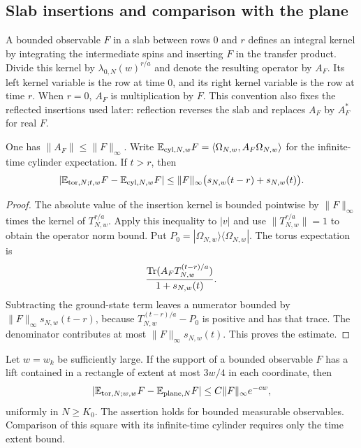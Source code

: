 \subsection{Slab insertions and comparison with the plane}

A bounded observable $F$ in a slab between rows $0$ and $r$ defines
an integral kernel by integrating the intermediate spins and inserting
$F$ in the transfer product.  Divide this kernel by
$\lambda_{0,N}(w)^{r/a}$ and denote the resulting operator by $A_F$.
Its left kernel variable is the row at time $0$, and its right kernel
variable is the row at time $r$.  When $r=0$, $A_F$ is multiplication
by $F$.  This convention also fixes the reflected insertions used
later: reflection reverses the slab and replaces $A_F$ by $A_F^*$
for real $F$.

\begin{lemma}
\label{tra:insertion}
One has $\|A_F\|\le\|F\|_\infty$.  Write
$\mathbb E_{\mathrm{cyl},N,w}F=\langle\Omega_{N,w},A_F\Omega_{N,w}\rangle$
for the infinite-time cylinder expectation.  If $t>r$, then
\begin{equation}
 \left|\mathbb E_{\mathrm{tor},N;t,w}F
       -\mathbb E_{\mathrm{cyl},N,w}F\right|
 \le\|F\|_\infty
       \bigl(s_{N,w}(t-r)+s_{N,w}(t)\bigr).
 \label{tra:torus-cylinder}
\end{equation}
\end{lemma}

\begin{proof}
The absolute value of the insertion kernel is bounded pointwise by
$\|F\|_\infty$ times the kernel of $T_{N,w}^{r/a}$.
Apply this inequality to $|v|$ and use $\|T_{N,w}^{r/a}\|=1$ to
obtain the operator norm bound.  Put
$P_0=|\Omega_{N,w}\rangle\langle\Omega_{N,w}|$.
The torus expectation is
\[
 \frac{\operatorname{Tr}(A_FT_{N,w}^{(t-r)/a})}{1+s_{N,w}(t)}.
\]
Subtracting the ground-state term leaves a numerator bounded by
$\|F\|_\infty s_{N,w}(t-r)$, because
$T_{N,w}^{(t-r)/a}-P_0$ is positive and has that trace.
The denominator contributes at most
$\|F\|_\infty s_{N,w}(t)$.  This proves the estimate.
\end{proof}

\begin{proposition}
\label{tra:comparison}
Let $w=w_k$ be sufficiently large.  If the support of a bounded
observable $F$ has a lift contained in a rectangle of extent at most
$3w/4$ in each coordinate, then
\begin{equation}
 \left|\mathbb E_{\mathrm{tor},N;w,w}F-\mathbb E_{\mathrm{plane},N}F\right|
       \le C\|F\|_\infty e^{-cw},
 \label{tra:plane-comparison}
\end{equation}
uniformly in $N\ge K_0$.  The assertion holds for bounded measurable
observables.  Comparison of this square with its infinite-time
cylinder requires only the time extent bound.
\end{proposition}

